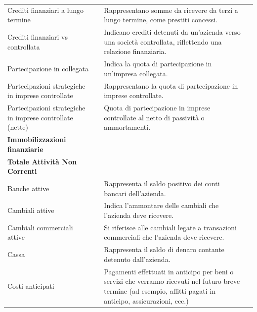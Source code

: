 \documentclass{article}
\newcommand{\CreditiFinanziariLungoTermine}{Rappresentano somme da ricevere da terzi a lungo termine, come prestiti concessi.}
\newcommand{\CreditiFinanziariVsControllata}{Indicano crediti detenuti da un'azienda verso una società controllata, riflettendo una relazione finanziaria.}
\newcommand{\PartecipazioneCollegata}{Indica la quota di partecipazione in un'impresa collegata.}
\newcommand{\PartecipazioniStrategicheControllate}{Rappresentano la quota di partecipazione in imprese controllate.}
\newcommand{\PartecipazioniStrategicheControllateNette}{Quota di partecipazione in imprese controllate al netto di passività o ammortamenti.}
\newcommand{\BancheAttive}{Rappresenta il saldo positivo dei conti bancari dell'azienda.}
\newcommand{\CambialiAttive}{Indica l'ammontare delle cambiali che l'azienda deve ricevere.}
\newcommand{\CambialiCommercialiAttive}{Si riferisce alle cambiali legate a transazioni commerciali che l'azienda deve ricevere.}
\newcommand{\Cassa}{Rappresenta il saldo di denaro contante detenuto dall'azienda.}
\newcommand{\CostiAnticipati}{Pagamenti effettuati in anticipo per beni o servizi che verranno ricevuti nel futuro breve termine (ad esempio, affitti pagati in anticipo, assicurazioni, ecc.)}
\begin{document}
\begin{table}[ht]
{\begin{tabular}{|l|c|l|c|}
            Crediti finanziari a lungo termine                                              &                    & \CreditiFinanziariLungoTermine                    &                 \\
            Crediti finanziari vs controllata                                               &                    & \CreditiFinanziariVsControllata                   &                 \\
            Partecipazione in collegata                                                     &                    & \PartecipazioneCollegata                          &                 \\
            Partecipazioni strategiche in imprese controllate                               &                    & \PartecipazioniStrategicheControllate             &                 \\
            Partecipazioni strategiche in imprese controllate (nette)                       &                    & \PartecipazioniStrategicheControllateNette        &                 \\
            \textbf{Immobilizzazioni finanziarie}                                           &                    &                                                   &                 \\
            \hline
            \textbf{Totale Attività Non Correnti}                                           &                    &                                                   &                 \\
            \hline
            Banche attive                                                                   &                    & \BancheAttive                                     &                 \\
            Cambiali attive                                                                 &                    & \CambialiAttive                                   &                 \\
            Cambiali commerciali attive                                                     &                    & \CambialiCommercialiAttive                        &                 \\
            Cassa                                                                           &                    & \Cassa                                            &                 \\
            Costi anticipati                                                                &                    & \CostiAnticipati                                  &                 \\

\end{tabular}}
\end{table}
\end{document}
